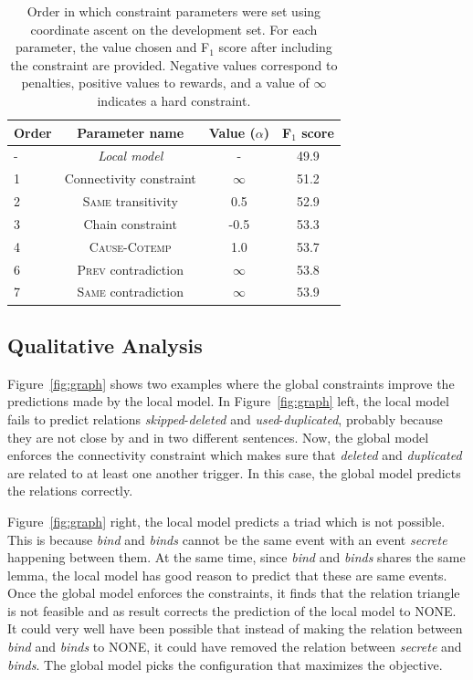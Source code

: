 
\begin{table}[t]
{\footnotesize
\begin{tabular}{| l | c | c | c |}
\hline
    \textbf{Order} & \textbf{Parameter name} & \textbf{Value} ($\alpha$)& \textbf{F$_1$ score} \\
\hline
\hline
- & \emph{Local model} & - & 49.9 \\
1 & Connectivity constraint & $\infty$ & 51.2 \\
2 & \textsc{Same} transitivity &  0.5 & 52.9 \\
3 & Chain constraint & -0.5 & 53.3\\
4 & \textsc{Cause}-\textsc{Cotemp} & 1.0 & 53.7\\
6 & \textsc{Prev} contradiction & $\infty$ & 53.8\\
7 & \textsc{Same} contradiction & $\infty$ & 53.9\\

\hline
\end{tabular}}
\caption{Order in which constraint parameters were set using coordinate ascent on the development set. For each parameter, the value chosen and F$_1$ score after including the constraint are provided. Negative values correspond to penalties, positive values to rewards, and a value of $\infty$ indicates a hard constraint.}
\label{tab:paramtuning}
\end{table}

\subsection{Qualitative Analysis} \label{subsec:analysis}

Figure~\ref{fig:graph} shows two examples where the global constraints improve the predictions made by the local model. In Figure~\ref{fig:graph} left, the local model fails to predict relations \emph{skipped}-\emph{deleted} and \emph{used}-\emph{duplicated}, probably because they are not close by and in two different sentences. Now, the global model enforces the connectivity constraint which makes sure that \emph{deleted} and \emph{duplicated} are related to at least one another trigger. In this case, the global model predicts the relations correctly.

Figure~\ref{fig:graph} right, the local model predicts a triad which is not possible. This is because \emph{bind} and \emph{binds} cannot be the same event with an event \emph{secrete} happening between them. At the same time, since \emph{bind} and \emph{binds} shares the same lemma, the local model has good reason to predict that these are same events. Once the global model enforces the constraints, it finds that the relation triangle is not feasible and as result corrects the prediction of the local model to NONE. It could very well have been possible that instead of making the relation between \emph{bind} and \emph{binds} to NONE, it could have removed the relation between \emph{secrete} and \emph{binds}. The global model picks the configuration that maximizes the objective.

